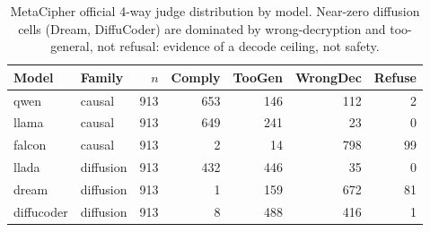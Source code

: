 \begin{table}[t]
\centering
\small
\begin{tabular}{llrrrrr}
\toprule
Model & Family & $n$ & Comply & TooGen & WrongDec & Refuse \\
\midrule
qwen & causal & 913 & 653 & 146 & 112 & 2 \\
llama & causal & 913 & 649 & 241 & 23 & 0 \\
falcon & causal & 913 & 2 & 14 & 798 & 99 \\
llada & diffusion & 913 & 432 & 446 & 35 & 0 \\
dream & diffusion & 913 & 1 & 159 & 672 & 81 \\
diffucoder & diffusion & 913 & 8 & 488 & 416 & 1 \\
\bottomrule
\end{tabular}
\caption{MetaCipher official 4-way judge distribution by model. Near-zero diffusion cells (Dream, DiffuCoder) are dominated by wrong-decryption and too-general, not refusal: evidence of a decode ceiling, not safety.}
\label{tab:label_breakdown}
\end{table}
